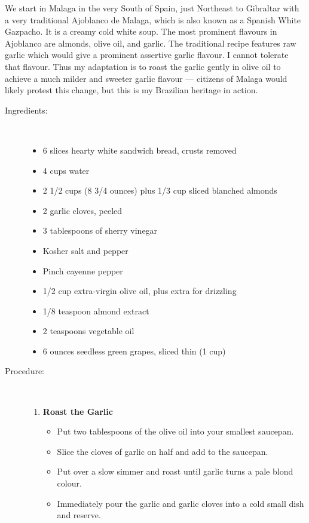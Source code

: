 \documentclass[11pt,letterpaper]{article}
\begin{document}


We start in Malaga in the very South of Spain, just Northeast to Gibraltar with a very traditional Ajoblanco de Malaga, which is also known as a Spanish White Gazpacho. It is a creamy cold white soup. The most prominent flavours in Ajoblanco are almonds, olive oil, and garlic. The traditional recipe features raw garlic which would give a prominent assertive garlic flavour. I cannot tolerate that flavour. Thus my adaptation is to roast the garlic gently in olive oil to achieve a much milder and sweeter garlic flavour --- citizens of Malaga would likely protest this change, but this is my Brazilian heritage in action.


\begin{description}

\item[Ingredients:]\ \\
	\begin{itemize}
	\item	6 slices hearty white sandwich bread, crusts removed
	\item 4 cups water
	\item 2 1/2 cups (8 3/4 ounces) plus 1/3 cup sliced blanched almonds
	\item 2 garlic cloves, peeled
	\item 3 tablespoons of sherry vinegar
	\item Kosher salt and pepper
	\item Pinch cayenne pepper
	\item 1/2 cup extra-virgin olive oil, plus extra for drizzling
	\item 1/8 teaspoon almond extract
	\item 2 teaspoons vegetable oil
	\item 6 ounces seedless green grapes, sliced thin (1 cup)
	\end{itemize}

\item[Procedure:]\ \\

	\begin{enumerate}
	\item {\bf Roast the Garlic}
	\begin{itemize}
	\item Put two tablespoons of the olive oil into your smallest saucepan.
	\item Slice the cloves of garlic on half and add to the saucepan.
	\item Put over a slow simmer and roast until garlic turns a pale blond colour. 
	\item Immediately pour the garlic and garlic cloves into a cold small dish and reserve.
	\end{itemize}
	

\end{enumerate}
\end{description}
\end{document}
